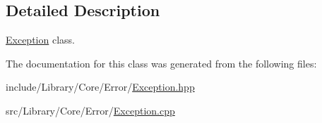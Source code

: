 \subsection{Detailed Description}
\hyperlink{classlibrary_1_1core_1_1error_1_1_exception}{Exception} class. 

The documentation for this class was generated from the following files\+:\begin{DoxyCompactItemize}
\item 
include/\+Library/\+Core/\+Error/\hyperlink{_exception_8hpp}{Exception.\+hpp}\item 
src/\+Library/\+Core/\+Error/\hyperlink{_exception_8cpp}{Exception.\+cpp}\end{DoxyCompactItemize}
